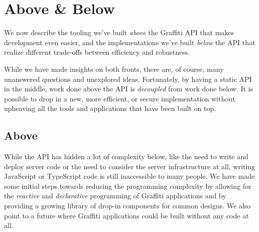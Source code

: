 \section{Above & Below}

We now describe the tooling we've built \emph{above}
the Graffiti API that makes development even easier, and
the implementations we've built \emph{below} the API
that realize different trade-offs between efficiency and
robustness.

While we have made insights on both fronts, there are, of course,
many unanswered questions and unexplored ideas.
Fortunately, by having a static API in the middle, work done above the API
is \emph{decoupled} from work done below.
It is possible to drop in a new, more efficient, or secure implementation
without upheaving all the tools and applications that have been built on top.


\subsection{Above}

While the API has hidden a lot of complexity below,
like the need to write and deploy server code or the need to
consider the server infrastructure at all,
writing JavaScript or TypeScript code is still inaccessible
to many people.
We have made some initial steps towards reducing the
programming complexity by allowing for the \emph{reactive} and
\emph{declarative} programming of Graffiti applications
and by providing a growing library of drop-in components for common designs.
We also point to a future where Graffiti applications could be built
without any code at all.

